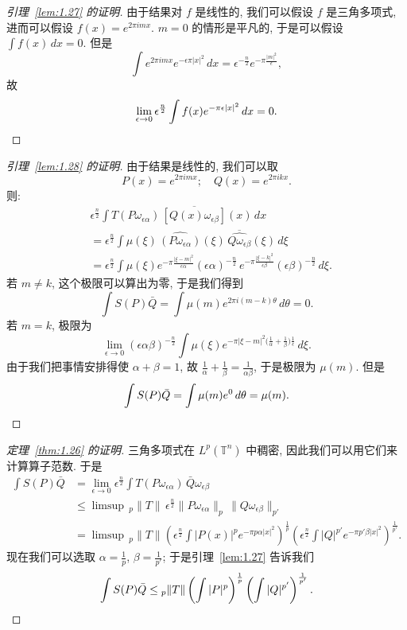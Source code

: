 \begin{proof}[引理~\ref{lem:1.27} 的证明]
由于结果对 $f$ 是线性的, 我们可以假设 $f$ 是三角多项式, 进而可以假设 $f(x)=e^{2\pi imx}$. $m=0$ 的情形是平凡的, 于是可以假设 $\int f(x)\,dx=0$. 但是
\[
\int e^{2\pi imx}e^{-\epsilon\pi|x|^2}\,dx=\epsilon^{-\frac{n}{2}}e^{-\pi\frac{|m|^2}{\epsilon}},
\]
故
\[
\lim_{\epsilon\to0}\epsilon^{\frac{n}{2}}\int f(x)e^{-\pi\epsilon|x|^2}\,dx=0. \qedhere
\]
\end{proof}

\begin{proof}[引理~\ref{lem:1.28} 的证明]
由于结果是线性的, 我们可以取
\[
P(x)=e^{2\pi imx};\quad Q(x)=e^{2\pi ikx}.
\]
则:
\begin{align*}
&\epsilon^{\frac{n}{2}}\int T(P\omega_{\epsilon\alpha})\,\overline{[Q(x)\omega_{\epsilon\beta}]}(x)\,dx \\
&=\epsilon^{\frac{n}{2}}\int\mu(\xi)\,\widehat{(P\omega_{\epsilon\alpha})}(\xi)\,\overline{\widehat{Q\omega_{\epsilon\beta}}}(\xi)\,d\xi \\
&=\epsilon^{\frac{n}{2}}\int\mu(\xi)e^{-\pi\frac{|\xi-m|^2}{\epsilon\alpha}}(\epsilon\alpha)^{-\frac{n}{2}}\,e^{-\pi\frac{|\xi-k|^2}{\epsilon\beta}}(\epsilon\beta)^{-\frac{n}{2}}\,d\xi.
\end{align*}
若 $m\neq k$, 这个极限可以算出为零, 于是我们得到
\[
\int S(P)\bar{Q}=\int\mu(m)e^{2\pi i(m-k)\theta}\,d\theta=0.
\]
若 $m=k$, 极限为
\[
\lim_{\epsilon\to0}(\epsilon\alpha\beta)^{-\frac{n}{2}}\int\mu(\xi)e^{-\pi|\xi-m|^2\bigl(\frac{1}{\alpha}+\frac{1}{\beta}\bigr)\frac{1}{\epsilon}}\,d\xi.
\]
由于我们把事情安排得使 $\alpha+\beta=1$, 故 $\frac{1}{\alpha}+\frac{1}{\beta}=\frac{1}{\alpha\beta}$, 于是极限为 $\mu(m)$. 但是
\[
\int S(P)\bar{Q}=\int\mu(m)e^{0}\,d\theta=\mu(m). \qedhere
\]
\end{proof}

\begin{proof}[定理~\ref{thm:1.26} 的证明]
三角多项式在 $L^p(\mathbb{T}^n)$ 中稠密, 因此我们可以用它们来计算算子范数. 于是
\begin{align*}
\int S(P)\bar{Q}&=\lim_{\epsilon\to0}\epsilon^{\frac{n}{2}}\int T(P\omega_{\epsilon\alpha})\,\bar{Q}\omega_{\epsilon\beta} \\
&\leq\limsup\,{}_p\|T\|\,\epsilon^{\frac{n}{2}}\|P\omega_{\epsilon\alpha}\|_p\,\|Q\omega_{\epsilon\beta}\|_{p'} \\
&=\limsup\,{}_p\|T\|\left(\epsilon^{\frac{n}{2}}\int|P(x)|^pe^{-\pi p\alpha|x|^2}\right)^{\frac{1}{p}}\left(\epsilon^{\frac{n}{2}}\int|Q|^{p'}e^{-\pi p'\beta|x|^2}\right)^{\frac{1}{p'}}.
\end{align*}
现在我们可以选取 $\alpha=\frac{1}{p}$, $\beta=\frac{1}{p'}$; 于是引理~\ref{lem:1.27} 告诉我们
\[
\int S(P)\bar{Q}\leq{}_p\|T\|\left(\int|P|^p\right)^{\frac{1}{p}}\left(\int|Q|^{p'}\right)^{\frac{1}{p'}}. \qedhere
\]
\end{proof}

